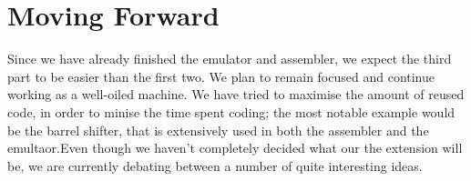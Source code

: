 \documentclass[11pt]{article}
\begin{document}
\section{Moving Forward}

Since we have already finished the emulator and assembler, we expect the third part to be easier than the first two.
We plan to remain focused and continue working as a well-oiled machine. We have tried to maximise the amount of reused
code, in order to minise the time spent coding; the most notable example would be the barrel shifter, that is extensively
used in both the assembler and the emultaor.Even though we haven't completely decided what our the extension will be,
we are currently debating between a number of quite interesting ideas.
\end{document}
